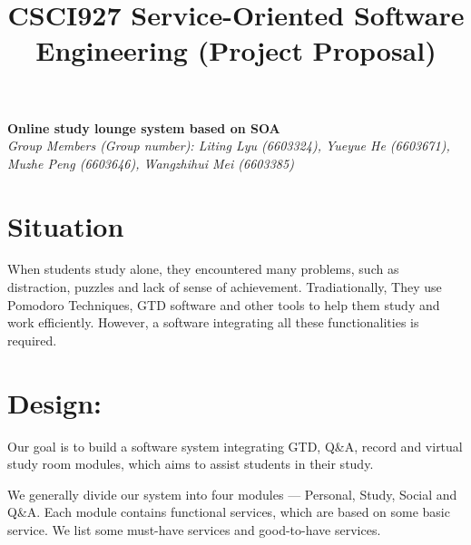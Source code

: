 \documentclass[runningheads]{llncs}
\begin{document}
\title{\large{CSCI927 Service-Oriented Software Engineering (Project Proposal)}}
\author{}
\institute{}
\maketitle
\vspace{-1cm}



\begin{center}
\Large{\textbf{Online study lounge system based on SOA}} \\ %
\vspace{0.2cm}
\large{\emph{Group Members (Group number): Liting Lyu (6603324), Yueyue  He (6603671), Muzhe Peng (6603646), Wangzhihui Mei (6603385)}} \\%
\vspace{0.3cm}
\end{center}

\section*{Situation}
When students study alone, they encountered many problems, such as distraction, puzzles and lack of sense of achievement. Tradiationally, They use Pomodoro Techniques, GTD software and other tools to help them study and work efficiently. However, a software integrating all these functionalities is required. 

\section*{Design:}
Our goal is to build a software system integrating GTD, Q\&A, record and virtual study room modules, which aims to assist students in their study. 

\noindent We generally divide our system into four modules --- Personal, Study, Social and Q\&A. Each module contains functional services, which are based on some basic service. We list some must-have services and good-to-have services.
\end{document}
